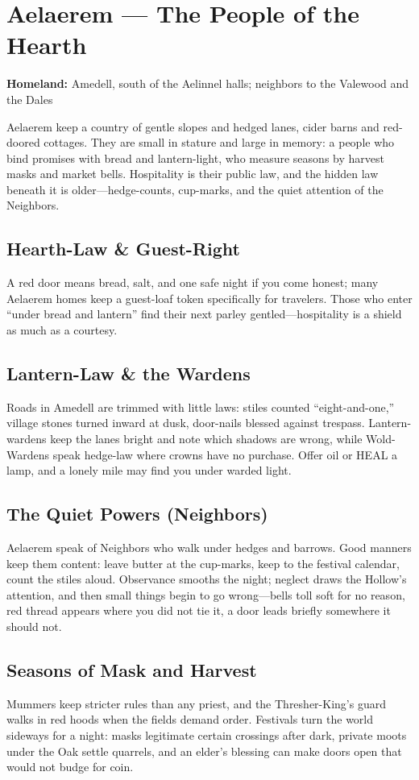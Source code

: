 \documentclass[11pt]{book}
\begin{document}
\section{Aelaerem --- The People of the Hearth}
\textbf{Homeland:} Amedell, south of the Aelinnel halls; neighbors to the Valewood and the Dales

Aelaerem keep a country of gentle slopes and hedged lanes, cider barns and red-doored cottages. They are small in stature and large in memory: a people who bind promises with bread and lantern-light, who measure seasons by harvest masks and market bells. Hospitality is their public law, and the hidden law beneath it is older---hedge-counts, cup-marks, and the quiet attention of the Neighbors.

\subsection*{Hearth-Law \& Guest-Right}
A red door means bread, salt, and one safe night if you come honest; many Aelaerem homes keep a guest-loaf token specifically for travelers. Those who enter ``under bread and lantern'' find their next parley gentled---hospitality is a shield as much as a courtesy.

\subsection*{Lantern-Law \& the Wardens}
Roads in Amedell are trimmed with little laws: stiles counted ``eight-and-one,'' village stones turned inward at dusk, door-nails blessed against trespass. Lantern-wardens keep the lanes bright and note which shadows are wrong, while Wold-Wardens speak hedge-law where crowns have no purchase. Offer oil or HEAL a lamp, and a lonely mile may find you under warded light.

\subsection*{The Quiet Powers (Neighbors)}
Aelaerem speak of Neighbors who walk under hedges and barrows. Good manners keep them content: leave butter at the cup-marks, keep to the festival calendar, count the stiles aloud. Observance smooths the night; neglect draws the Hollow's attention, and then small things begin to go wrong---bells toll soft for no reason, red thread appears where you did not tie it, a door leads briefly somewhere it should not.

\subsection*{Seasons of Mask and Harvest}
Mummers keep stricter rules than any priest, and the Thresher-King's guard walks in red hoods when the fields demand order. Festivals turn the world sideways for a night: masks legitimate certain crossings after dark, private moots under the Oak settle quarrels, and an elder's blessing can make doors open that would not budge for coin.
\end{document}
